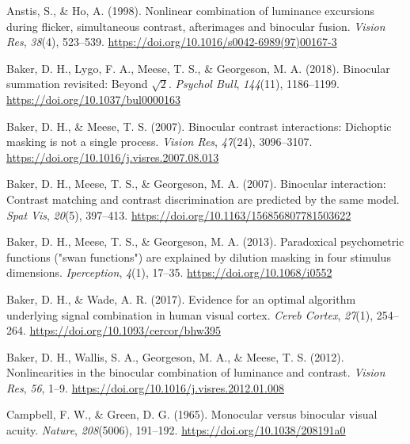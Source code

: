 \documentclass[
]{article}
\newlength{\cslhangindent}
\newlength{\cslentryspacingunit} %
\newenvironment{CSLReferences}[2] %
 {%
  \setlength{\parindent}{0pt}
  \ifodd #1
  \let\oldpar\par
  \def\par{\hangindent=\cslhangindent\oldpar}
  \fi
  \setlength{\parskip}{#2\cslentryspacingunit}
 }%
 {}
\begin{document}
\hypertarget{refs}{}
\begin{CSLReferences}{1}{0}
\leavevmode{}%
Anstis, S., \& Ho, A. (1998). Nonlinear combination of luminance excursions during flicker, simultaneous contrast, afterimages and binocular fusion. \emph{Vision Res}, \emph{38}(4), 523--539. \url{https://doi.org/10.1016/s0042-6989(97)00167-3}

\leavevmode{}%
Baker, D. H., Lygo, F. A., Meese, T. S., \& Georgeson, M. A. (2018). Binocular summation revisited: Beyond \(\sqrt{2}\). \emph{Psychol Bull}, \emph{144}(11), 1186--1199. \url{https://doi.org/10.1037/bul0000163}

\leavevmode{}%
Baker, D. H., \& Meese, T. S. (2007). Binocular contrast interactions: Dichoptic masking is not a single process. \emph{Vision Res}, \emph{47}(24), 3096--3107. \url{https://doi.org/10.1016/j.visres.2007.08.013}

\leavevmode{}%
Baker, D. H., Meese, T. S., \& Georgeson, M. A. (2007). Binocular interaction: Contrast matching and contrast discrimination are predicted by the same model. \emph{Spat Vis}, \emph{20}(5), 397--413. \url{https://doi.org/10.1163/156856807781503622}

\leavevmode{}%
Baker, D. H., Meese, T. S., \& Georgeson, M. A. (2013). Paradoxical psychometric functions ("swan functions") are explained by dilution masking in four stimulus dimensions. \emph{Iperception}, \emph{4}(1), 17--35. \url{https://doi.org/10.1068/i0552}

\leavevmode{}%
Baker, D. H., \& Wade, A. R. (2017). Evidence for an optimal algorithm underlying signal combination in human visual cortex. \emph{Cereb Cortex}, \emph{27}(1), 254--264. \url{https://doi.org/10.1093/cercor/bhw395}

\leavevmode{}%
Baker, D. H., Wallis, S. A., Georgeson, M. A., \& Meese, T. S. (2012). Nonlinearities in the binocular combination of luminance and contrast. \emph{Vision Res}, \emph{56}, 1--9. \url{https://doi.org/10.1016/j.visres.2012.01.008}

\leavevmode{}%
Campbell, F. W., \& Green, D. G. (1965). Monocular versus binocular visual acuity. \emph{Nature}, \emph{208}(5006), 191--192. \url{https://doi.org/10.1038/208191a0}


\end{CSLReferences}
\end{document}
